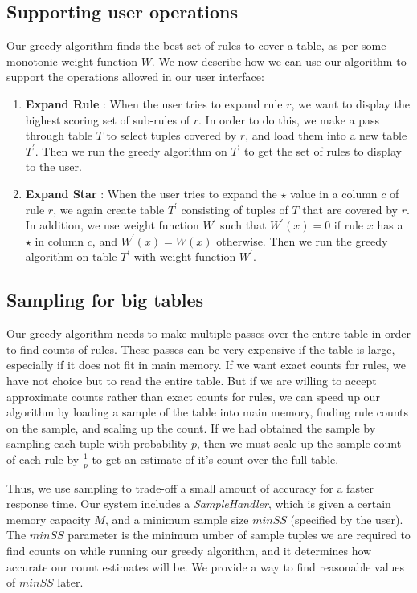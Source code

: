\documentclass{sig-alternate}
\begin{document}
\subsection{Supporting user operations}
Our greedy algorithm finds the best set of rules to cover a table, as per some monotonic weight function $W$. We now describe how we can use our algorithm to support the operations allowed in our user interface:
\begin{enumerate}
\item \textbf{Expand Rule} : When the user tries to expand rule $r$, we want to display the highest scoring set of sub-rules of $r$. In order to do this, we make a pass through table $T$ to select tuples covered by $r$, and load them into a new table $T^{\prime}$. Then we run the greedy algorithm on $T^{\prime}$ to get the set of rules to display to the user.
\item \textbf{Expand Star} : When the user tries to expand the $\star$ value in a column $c$ of rule $r$, we again create table $T^{\prime}$ consisting of tuples of $T$ that are covered by $r$. In addition, we use weight function $W^{\prime}$ such that $W^{\prime}(x) = 0$ if rule $x$ has a $\star$ in column $c$, and $W^{\prime}(x) = W(x)$ otherwise. Then we run the greedy algorithm on table $T^{\prime}$ with weight function $W^{\prime}$.
\end{enumerate}

\subsection{Sampling for big tables}
Our greedy algorithm needs to make multiple passes over the entire table in order to find counts of rules. These passes can be very expensive if the table is large, especially if it does not fit in main memory. If we want exact counts for rules, we have not choice but to read the entire table. But if we are willing to accept approximate counts rather than exact counts for rules, we can speed up our algorithm by loading a sample of the table into main memory, finding rule counts on the sample, and scaling up the count. If we had obtained the sample by sampling each tuple with probability $p$, then we must scale up the sample count of each rule by $\frac{1}{p}$ to get an estimate of it's count over the full table.

Thus, we use sampling to trade-off a small amount of accuracy for a faster response time. Our system includes a {\em SampleHandler}, which is given a certain memory capacity $M$, and a minimum sample size $minSS$ (specified by the user).
The $minSS$ parameter is the minimum umber of sample tuples we are required to find counts on while running our greedy algorithm, and it determines how accurate our count estimates will be. We provide a way to find reasonable values of $minSS$ later.
\end{document}
